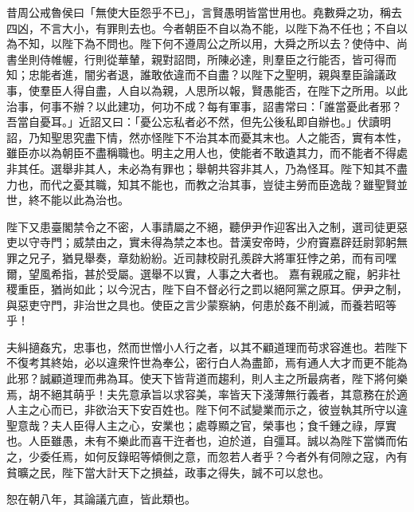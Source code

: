 \begin{pinyinscope}
 
 
 
 昔周公戒魯侯曰「無使大臣怨乎不已」，言賢愚明皆當世用也。堯數舜之功，稱去四凶，不言大小，有罪則去也。今者朝臣不自以為不能，以陛下為不任也；不自以為不知，以陛下為不問也。陛下何不遵周公之所以用，大舜之所以去？使侍中、尚書坐則侍帷幄，行則從華輦，親對詔問，所陳必達，則羣臣之行能否，皆可得而知；忠能者進，闇劣者退，誰敢依違而不自盡？以陛下之聖明，親與羣臣論議政事，使羣臣人得自盡，人自以為親，人思所以報，賢愚能否，在陛下之所用。以此治事，何事不辦？以此建功，何功不成？每有軍事，詔書常曰：「誰當憂此者邪？吾當自憂耳。」近詔又曰：「憂公忘私者必不然，但先公後私即自辦也。」伏讀明詔，乃知聖思究盡下情，然亦怪陛下不治其本而憂其末也。人之能否，實有本性，雖臣亦以為朝臣不盡稱職也。明主之用人也，使能者不敢遺其力，而不能者不得處非其任。選舉非其人，未必為有罪也；舉朝共容非其人，乃為怪耳。陛下知其不盡力也，而代之憂其職，知其不能也，而教之治其事，豈徒主勞而臣逸哉？雖聖賢並世，終不能以此為治也。
 
 
陛下又患臺閣禁令之不密，人事請屬之不絕，聽伊尹作迎客出入之制，選司徒更惡吏以守寺門；威禁由之，實未得為禁之本也。昔漢安帝時，少府竇嘉辟廷尉郭躬無罪之兄子，猶見舉奏，章劾紛紛。近司隷校尉孔羨辟大將軍狂悖之弟，而有司嘿爾，望風希指，甚於受屬。選舉不以實，人事之大者也。
 嘉有親戚之寵，躬非社稷重臣，猶尚如此；以今況古，陛下自不督必行之罰以絕阿黨之原耳。伊尹之制，與惡吏守門，非治世之具也。使臣之言少蒙察納，何患於姦不削滅，而養若昭等乎！
 
 
 
 
 夫糾擿姦宄，忠事也，然而世憎小人行之者，以其不顧道理而苟求容進也。若陛下不復考其終始，必以違衆忤世為奉公，密行白人為盡節，焉有通人大才而更不能為此邪？誠顧道理而弗為耳。使天下皆背道而趨利，則人主之所最病者，陛下將何樂焉，胡不絕其萌乎！夫先意承旨以求容美，率皆天下淺薄無行義者，其意務在於適人主之心而已，非欲治天下安百姓也。陛下何不試變業而示之，彼豈執其所守以違聖意哉？夫人臣得人主之心，安業也；處尊顯之官，榮事也；食千鍾之祿，厚實也。人臣雖愚，未有不樂此而喜干迕者也，迫於道，自彊耳。誠以為陛下當憐而佑之，少委任焉，如何反錄昭等傾側之意，而忽若人者乎？今者外有伺隙之寇，內有貧曠之民，陛下當大計天下之損益，政事之得失，誠不可以怠也。
 
 
 
 
 恕在朝八年，其論議亢直，皆此類也。
 

\end{pinyinscope}

